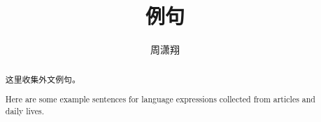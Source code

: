 \documentclass[11pt]{amsart}
\begin{document}
\date{}

\title
{例句}


\author{周潇翔}
\address{School of Mathematical Sciences\\
University of Science and Technology of China\\
Hefei, 230026\\ P.R. China\\} 





\begin{abstract}
这里收集外文例句。

Here are some example sentences for language expressions collected from articles and daily lives. 
\end{abstract}



\maketitle
\end{document}
